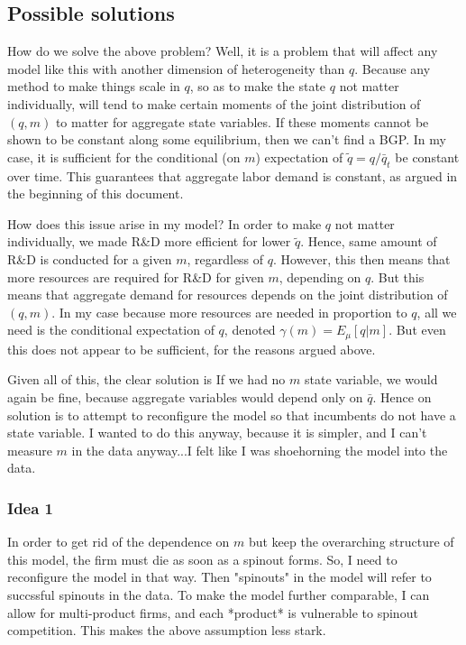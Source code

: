 \documentclass[12pt,english]{article}
\theoremstyle{remark}
\begin{document}
\subsection{Possible solutions}

How do we solve the above problem? Well, it is a problem that will affect any model like this with another dimension of heterogeneity than $q$. Because any method to make things scale in $q$, so as to make the state $q$ not matter individually, will tend to make certain moments of the joint distribution of $(q,m)$ to matter for aggregate state variables. If these moments cannot be shown to be constant along some equilibrium, then we can't find a BGP. In my case, it is sufficient for the conditional (on $m$) expectation of $\tilde{q} = q / \bar{q}_t$ be constant over time. This guarantees that aggregate labor demand is constant, as argued in the beginning of this document.  

How does this issue arise in my model? In order to make $q$ not matter individually, we made R\&D more efficient for lower $\tilde{q}$. Hence, same amount of R\&D is conducted for a given $m$, regardless of $q$. However, this then means that more resources are required for R\&D for given $m$, depending on $q$. But this means that aggregate demand for resources depends on the joint distribution of $(q,m)$. In my case because more resources are needed in proportion to $q$, all we need is the conditional expectation of $q$, denoted $\gamma(m) = E_{\mu}[q |m]$. But even this does not appear to be sufficient, for the reasons argued above. 

Given all of this, the clear solution is If we had no $m$ state variable, we would again be fine, because aggregate variables would depend only on $\bar{q}$. Hence on solution is to attempt to reconfigure the model so that incumbents do not have a state variable. I wanted to do this anyway, because it is simpler, and I can't measure $m$ in the data anyway...I felt like I was shoehorning the model into the data.

\subsubsection{Idea 1}

In order to get rid of the dependence on $m$ but keep the overarching structure of this model, the firm must die as soon as a spinout forms. So, I need to reconfigure the model in that way. Then "spinouts" in the model will refer to succssful spinouts in the data. To make the model further comparable, I can allow for multi-product firms, and each *product* is vulnerable to spinout competition. This makes the above assumption less stark.
\end{document}
